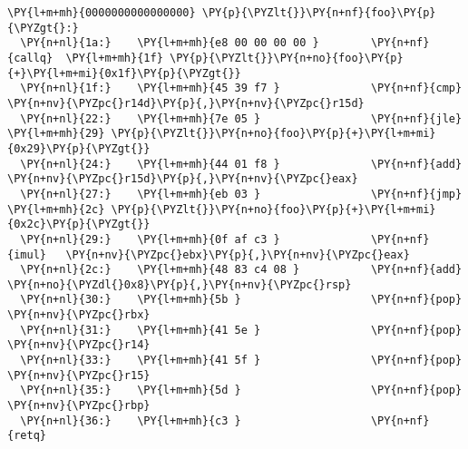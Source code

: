 \begin{Verbatim}[commandchars=\\\{\}]
\PY{l+m+mh}{0000000000000000} \PY{p}{\PYZlt{}}\PY{n+nf}{foo}\PY{p}{\PYZgt{}:}
  \PY{n+nl}{1a:}	\PY{l+m+mh}{e8 00 00 00 00 }      	\PY{n+nf}{callq}  \PY{l+m+mh}{1f} \PY{p}{\PYZlt{}}\PY{n+no}{foo}\PY{p}{+}\PY{l+m+mi}{0x1f}\PY{p}{\PYZgt{}}
  \PY{n+nl}{1f:}	\PY{l+m+mh}{45 39 f7 }            	\PY{n+nf}{cmp}    \PY{n+nv}{\PYZpc{}r14d}\PY{p}{,}\PY{n+nv}{\PYZpc{}r15d}
  \PY{n+nl}{22:}	\PY{l+m+mh}{7e 05 }               	\PY{n+nf}{jle}    \PY{l+m+mh}{29} \PY{p}{\PYZlt{}}\PY{n+no}{foo}\PY{p}{+}\PY{l+m+mi}{0x29}\PY{p}{\PYZgt{}}
  \PY{n+nl}{24:}	\PY{l+m+mh}{44 01 f8 }            	\PY{n+nf}{add}    \PY{n+nv}{\PYZpc{}r15d}\PY{p}{,}\PY{n+nv}{\PYZpc{}eax}
  \PY{n+nl}{27:}	\PY{l+m+mh}{eb 03 }               	\PY{n+nf}{jmp}    \PY{l+m+mh}{2c} \PY{p}{\PYZlt{}}\PY{n+no}{foo}\PY{p}{+}\PY{l+m+mi}{0x2c}\PY{p}{\PYZgt{}}
  \PY{n+nl}{29:}	\PY{l+m+mh}{0f af c3 }            	\PY{n+nf}{imul}   \PY{n+nv}{\PYZpc{}ebx}\PY{p}{,}\PY{n+nv}{\PYZpc{}eax}
  \PY{n+nl}{2c:}	\PY{l+m+mh}{48 83 c4 08 }         	\PY{n+nf}{add}    \PY{n+no}{\PYZdl{}0x8}\PY{p}{,}\PY{n+nv}{\PYZpc{}rsp}
  \PY{n+nl}{30:}	\PY{l+m+mh}{5b }                  	\PY{n+nf}{pop}    \PY{n+nv}{\PYZpc{}rbx}
  \PY{n+nl}{31:}	\PY{l+m+mh}{41 5e }               	\PY{n+nf}{pop}    \PY{n+nv}{\PYZpc{}r14}
  \PY{n+nl}{33:}	\PY{l+m+mh}{41 5f }               	\PY{n+nf}{pop}    \PY{n+nv}{\PYZpc{}r15}
  \PY{n+nl}{35:}	\PY{l+m+mh}{5d }                  	\PY{n+nf}{pop}    \PY{n+nv}{\PYZpc{}rbp}
  \PY{n+nl}{36:}	\PY{l+m+mh}{c3 }                  	\PY{n+nf}{retq}   
\end{Verbatim}
